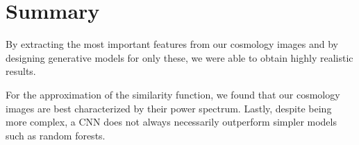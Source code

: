 \documentclass[10pt,conference,compsocconf]{IEEEtran}
\newcommand\TODO[1]{\textcolor{red}{#1}} %
\begin{document}






\section{Summary}

By extracting the most important features from our cosmology images and by designing generative models for only these, we were able to obtain highly realistic results.


For the approximation of the similarity function, we found that our cosmology images are best characterized by their power spectrum. Lastly, despite being more complex, a CNN does not always necessarily outperform simpler models such as random forests. %



\newpage





\clearpage




\end{document}
